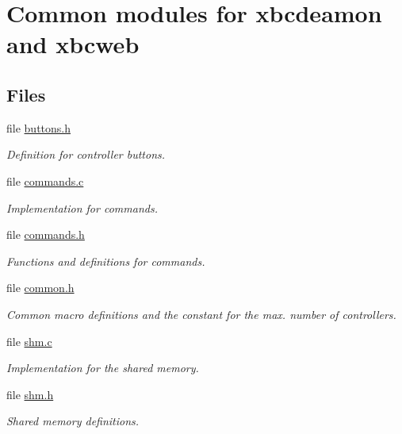 \hypertarget{group__common}{\section{Common modules for xbcdeamon and xbcweb}
\label{group__common}
}
\subsection*{Files}
\begin{DoxyCompactItemize}
\item 
file \hyperlink{buttons_8h}{buttons.\-h}
\begin{DoxyCompactList}\small\item\em Definition for controller buttons. \end{DoxyCompactList}\item 
file \hyperlink{commands_8c}{commands.\-c}
\begin{DoxyCompactList}\small\item\em Implementation for commands. \end{DoxyCompactList}\item 
file \hyperlink{commands_8h}{commands.\-h}
\begin{DoxyCompactList}\small\item\em Functions and definitions for commands. \end{DoxyCompactList}\item 
file \hyperlink{common_8h}{common.\-h}
\begin{DoxyCompactList}\small\item\em Common macro definitions and the constant for the max. number of controllers. \end{DoxyCompactList}\item 
file \hyperlink{shm_8c}{shm.\-c}
\begin{DoxyCompactList}\small\item\em Implementation for the shared memory. \end{DoxyCompactList}\item 
file \hyperlink{shm_8h}{shm.\-h}
\begin{DoxyCompactList}\small\item\em Shared memory definitions. \end{DoxyCompactList}\end{DoxyCompactItemize}

